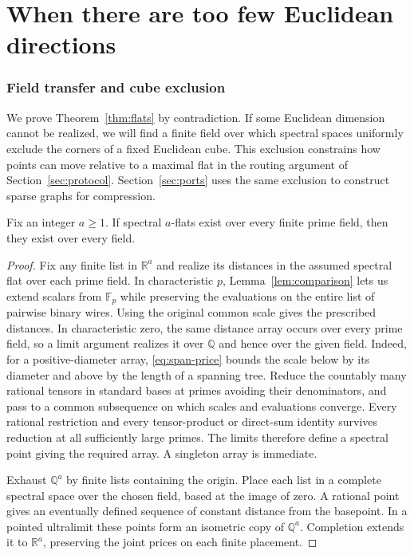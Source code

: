 \part[When there are too few Euclidean directions]{When there are too few \titlebreak Euclidean directions}
\section{Field transfer and cube exclusion}\label{sec:prices}

We prove Theorem~\ref{thm:flats} by contradiction. If some Euclidean
dimension cannot be realized, we will find a finite field over which
spectral spaces uniformly exclude the corners of a fixed Euclidean cube.
This exclusion constrains how points can move relative to a maximal flat
in the routing argument of Section~\ref{sec:protocol}. Section~\ref{sec:ports}
uses the same exclusion to construct sparse graphs for compression.

\par{}
\begin{lemma}\label{lem:transfer}
Fix an integer $a\ge1$. If spectral $a$-flats exist over every finite prime field, then
they exist over every field.
\end{lemma}
\begin{proof}
Fix any finite list in $\mathbb R^a$ and realize its distances in the assumed
spectral flat over each prime field. In characteristic $p$,
Lemma~\ref{lem:comparison} lets us extend scalars from $\mathbb F_p$
while preserving the evaluations on the entire list of pairwise binary wires. Using the original common scale gives the
prescribed distances. In characteristic zero, the same distance array occurs
over every prime field, so a limit argument
realizes it over $\mathbb Q$ and hence over the given field. Indeed, for a
positive-diameter array, \eqref{eq:span-price} bounds the scale below
by its diameter and above by the length of a spanning tree. Reduce the countably many rational tensors in
standard bases at primes avoiding their denominators, and pass to a common
subsequence on which scales and evaluations converge. Every rational
restriction and every tensor-product or direct-sum identity survives reduction
at all sufficiently large primes. The limits therefore define a spectral
point giving the required array. A singleton array is immediate.

Exhaust $\mathbb Q^a$ by finite lists containing the origin. Place each list in
a complete spectral space over the chosen field, based at the image of zero.
A rational point gives an eventually defined sequence of constant distance
from the basepoint. In a pointed ultralimit these points form an isometric
copy of $\mathbb Q^a$. Completion extends it to $\mathbb R^a$, preserving
the joint prices on each finite placement.
\end{proof}

